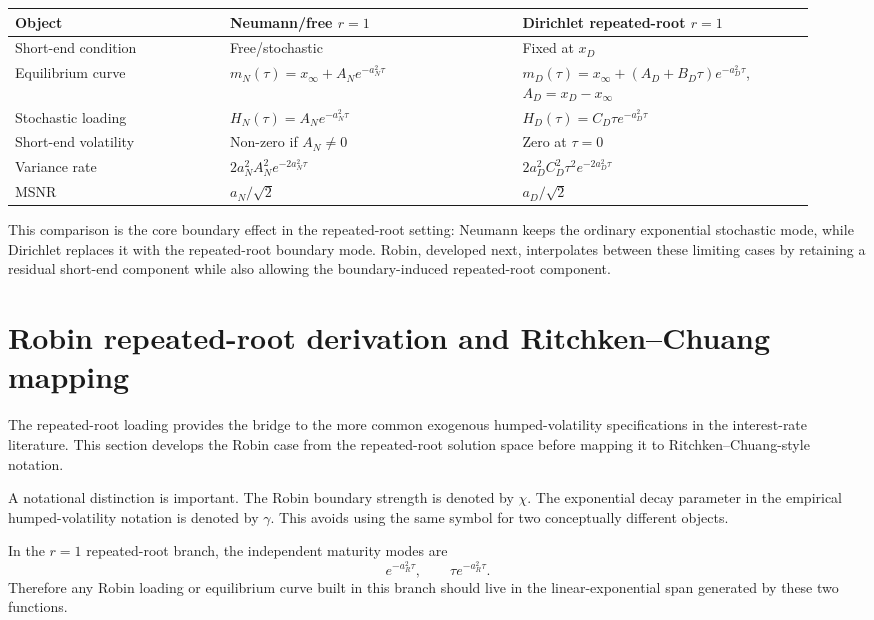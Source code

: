 \documentclass[11pt]{article}
\numberwithin{equation}{section}
\begin{document}
\clearpage
\begin{longtable}{p{0.25\linewidth}p{0.34\linewidth}p{0.34\linewidth}}
\toprule
Object & Neumann/free $r=1$ & Dirichlet repeated-root $r=1$\\
\midrule
Short-end condition & Free/stochastic & Fixed at $x_D$\\
Equilibrium curve & $m_N(\tau)=x_\infty+A_Ne^{-a_N^2\tau}$ & $m_D(\tau)=x_\infty+(A_D+B_D\tau)e^{-a_D^2\tau}$, $A_D=x_D-x_\infty$\\
Stochastic loading & $H_N(\tau)=A_Ne^{-a_N^2\tau}$ & $H_D(\tau)=C_D\tau e^{-a_D^2\tau}$\\
Short-end volatility & Non-zero if $A_N\neq0$ & Zero at $\tau=0$\\
Variance rate & $2a_N^2A_N^2e^{-2a_N^2\tau}$ & $2a_D^2C_D^2\tau^2e^{-2a_D^2\tau}$\\
MSNR & $a_N/\sqrt{2}$ & $a_D/\sqrt{2}$\\
\bottomrule
\end{longtable}

This comparison is the core boundary effect in the repeated-root setting: Neumann keeps the ordinary exponential stochastic mode, while Dirichlet replaces it with the repeated-root boundary mode. Robin, developed next, interpolates between these limiting cases by retaining a residual short-end component while also allowing the boundary-induced repeated-root component.

\section{Robin repeated-root derivation and Ritchken--Chuang mapping}

The repeated-root loading provides the bridge to the more common exogenous humped-volatility specifications in the interest-rate literature. This section develops the Robin case from the repeated-root solution space before mapping it to Ritchken--Chuang-style notation.

A notational distinction is important. The Robin boundary strength is denoted by $\chi$. The exponential decay parameter in the empirical humped-volatility notation is denoted by $\gamma$. This avoids using the same symbol for two conceptually different objects.

In the $r=1$ repeated-root branch, the independent maturity modes are
\begin{equation}
e^{-a_R^2\tau},
\qquad
\tau e^{-a_R^2\tau}.
\end{equation}
Therefore any Robin loading or equilibrium curve built in this branch should live in the linear-exponential span generated by these two functions.
\end{document}
